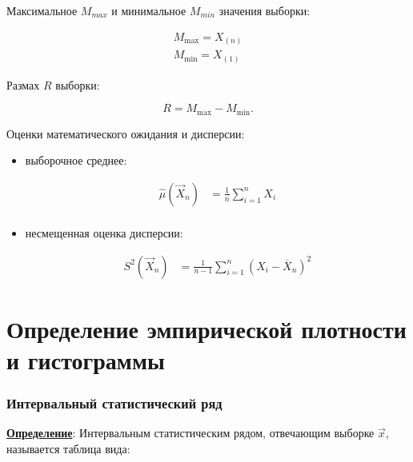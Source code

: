 Максимальное $M_{max}$ и минимальное $M_{min}$ значения выборки:

\begin{equation}
    \begin{aligned}
        M_{\max} = X_{(n)}\\
        M_{\min} = X_{(1)}
    \end{aligned}
\end{equation}


Размах $R$ выборки:

\begin{equation}
    R = M_{\max} - M_{\min}.
\end{equation}


Оценки математического ожидания и дисперсии:

\begin{itemize}
    \item выборочное среднее:

    \begin{equation}
        \begin{aligned}
        \hat\mu(\vec X_n) &= \frac 1n \sum_{i=1}^n X_i\\
        \end{aligned}
    \end{equation}
    
    \item несмещенная оценка дисперсии:

    \begin{equation}
        \begin{aligned}
        S^2(\vec X_n) &= \frac 1{n-1} \sum_{i=1}^n (X_i-\overline X_n)^2
        \end{aligned}
    \end{equation}

\end{itemize}


\section{Определение эмпирической плотности и гистограммы}

\subsubsection{Интервальный статистический ряд}

\textbf{\underline{Определение}}: Интервальным статистическим рядом, отвечающим выборке $\vec x$, называется таблица вида:

